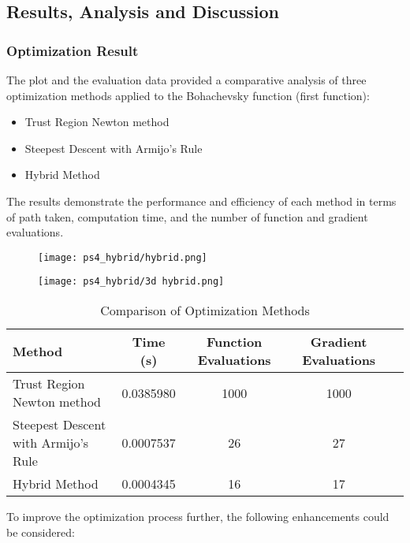 \documentclass{article} %
\theoremstyle{definition}
\theoremstyle{remark}
\theoremstyle{plain}
\begin{document}
\subsection{Results, Analysis and Discussion}
    \subsubsection{Optimization Result}
    The plot and the evaluation data provided a comparative analysis of three optimization methods applied to the Bohachevsky function (first function):
    \begin{itemize}
        \item Trust Region Newton method
        \item Steepest Descent with Armijo's Rule
        \item Hybrid Method
    \end{itemize}

    The results demonstrate the performance and efficiency of each method in terms of path taken, computation time, and the number of function and gradient evaluations.
    
    \begin{figure}[h!]
        \centering
        \texttt{[image: ps4\_hybrid/hybrid.png]}
    \end{figure}
    
    \begin{figure}[h!]
        \centering
        \texttt{[image: ps4\_hybrid/3d hybrid.png]}
    \end{figure}

    \begin{table}[h!]
    \centering
    \caption*{Comparison of Optimization Methods}
    \begin{tabular}{lcccc}
    \toprule
    \textbf{Method} & \textbf{Time (s)} & \textbf{Function Evaluations} & \textbf{Gradient Evaluations} \\
    \midrule
    Trust Region Newton method & 0.0385980 & 1000 & 1000 \\
    Steepest Descent with Armijo's Rule & 0.0007537 & 26 & 27 \\
    Hybrid Method & 0.0004345 & 16 & 17 \\
    \bottomrule
    \end{tabular}
    \label{tab:comparison}
    \end{table}

    \newpage
    To improve the optimization process further, the following enhancements could be considered:
\end{document}
